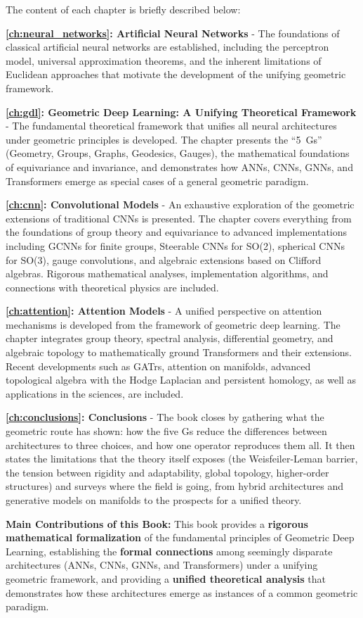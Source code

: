 The content of each chapter is briefly described below:

\textbf{\autoref{ch:neural_networks}: Artificial Neural Networks} - The foundations of classical artificial neural networks are established, including the perceptron model, universal approximation theorems, and the inherent limitations of Euclidean approaches that motivate the development of the unifying geometric framework.

\textbf{\autoref{ch:gdl}: Geometric Deep Learning: A Unifying Theoretical Framework} - The fundamental theoretical framework that unifies all neural architectures under geometric principles is developed. The chapter presents the ``5~Gs'' (Geometry, Groups, Graphs, Geodesics, Gauges), the mathematical foundations of equivariance and invariance, and demonstrates how \glspl{ANN}, \glspl{CNN}, \glspl{GNN}, and \glspl{Transformer} emerge as special cases of a general geometric paradigm.

\textbf{\autoref{ch:cnn}: Convolutional Models} - An exhaustive exploration of the geometric extensions of traditional \glspl{CNN} is presented. The chapter covers everything from the foundations of group theory and equivariance to advanced implementations including \glspl{GCNN} for finite groups, Steerable \glspl{CNN} for SO(2), spherical \glspl{CNN} for SO(3), gauge convolutions, and algebraic extensions based on Clifford algebras. Rigorous mathematical analyses, implementation algorithms, and connections with theoretical physics are included.

\textbf{\autoref{ch:attention}: Attention Models} - A unified perspective on attention mechanisms is developed from the framework of geometric deep learning. The chapter integrates group theory, spectral analysis, differential geometry, and algebraic topology to mathematically ground \glspl{Transformer} and their extensions. Recent developments such as \glspl{GATr}, attention on manifolds, advanced topological algebra with the Hodge Laplacian and persistent homology, as well as applications in the sciences, are included.

\textbf{\autoref{ch:conclusions}: Conclusions} - The book closes by gathering what the geometric route has shown: how the five Gs reduce the differences between architectures to three choices, and how one operator reproduces them all. It then states the limitations that the theory itself exposes (the Weisfeiler-Leman barrier, the tension between rigidity and adaptability, global topology, higher-order structures) and surveys where the field is going, from hybrid architectures and generative models on manifolds to the prospects for a unified theory.

\bigskip

\textbf{Main Contributions of this Book:} This book provides a \textbf{rigorous mathematical formalization} of the fundamental principles of Geometric Deep Learning, establishing the \textbf{formal connections} among seemingly disparate architectures (\glspl{ANN}, \glspl{CNN}, \glspl{GNN}, and \glspl{Transformer}) under a unifying geometric framework, and providing a \textbf{unified theoretical analysis} that demonstrates how these architectures emerge as instances of a common geometric paradigm.
